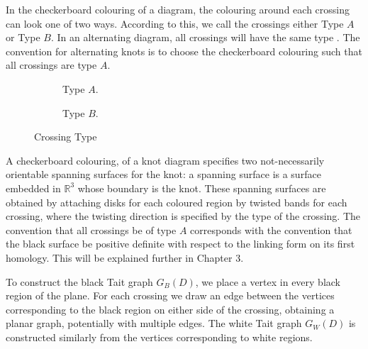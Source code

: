 \documentclass[12pt]{report}
\newcommand{\R}{\mathbb{R}}
\theoremstyle{upright}
\begin{document}
In the checkerboard colouring of a diagram, the colouring around each crossing can look one of two ways. According to this, we call the crossings either Type $A$ or Type $B$. In an alternating diagram, all crossings will have the same type \cite[300]{spanning-tree-expansion-jones-polynomial}. The convention for alternating knots is to choose the checkerboard colouring such that all crossings are type $A$.

\begin{figure}[hbt]
	\centering
	\hspace*{\fill}
	\begin{subfigure}[b]{0.4 \textwidth}
		\centering
		\def\svgscale{0.28}
		
		\caption{Type $A$.}
		\label{fig:type-a}
	\end{subfigure}
	\hspace*{\fill} \hspace*{\fill}	\hspace*{\fill}
	\begin{subfigure}[b]{0.4 \textwidth}
		\centering
		\def\svgscale{0.28}
		
		\caption{Type $B$.}
		\label{fig:type-b}
	\end{subfigure}
	\hspace*{\fill} 
	\caption{Crossing Type}
	\label{fig:crossing-type}
\end{figure}


A checkerboard colouring, of a knot diagram specifies two not-necessarily orientable spanning surfaces for the knot: a spanning surface is a surface embedded in $\R^{3}$ whose boundary is the knot. These spanning surfaces are obtained by attaching disks for each coloured region by twisted bands for each crossing, where the twisting direction is specified by the type of the crossing. The convention that all crossings be of type $A$ corresponds with the convention that the black surface be positive definite with respect to the linking form on its first homology. This will be explained further in Chapter 3.

To construct the black Tait graph $G_{B}(D)$, we place a vertex in every black region of the plane. For each crossing we draw an edge between the vertices corresponding to the black region on either side of the crossing, obtaining a planar graph, potentially with multiple edges. The white Tait graph $G_{W}(D)$ is constructed similarly from the vertices corresponding to white regions.
\end{document}
